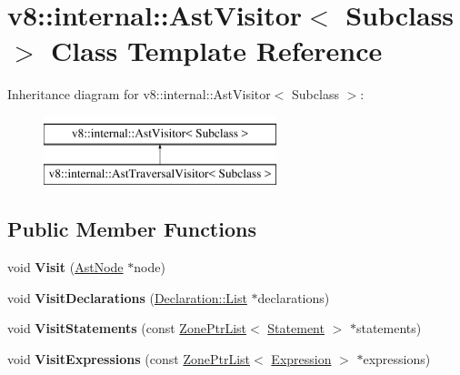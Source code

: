\hypertarget{classv8_1_1internal_1_1AstVisitor}{}\section{v8\+:\+:internal\+:\+:Ast\+Visitor$<$ Subclass $>$ Class Template Reference}
\label{classv8_1_1internal_1_1AstVisitor}
Inheritance diagram for v8\+:\+:internal\+:\+:Ast\+Visitor$<$ Subclass $>$\+:\begin{figure}[H]
\begin{center}
\leavevmode
\includegraphics[height=2.000000cm]{classv8_1_1internal_1_1AstVisitor}
\end{center}
\end{figure}
\subsection*{Public Member Functions}
\begin{DoxyCompactItemize}
\item 
\mbox{\label{classv8_1_1internal_1_1AstVisitor_a748e27887cfe2a26983f9e4ba61f586e}} 
void {\bfseries Visit} (\mbox{\hyperlink{classv8_1_1internal_1_1AstNode}{Ast\+Node}} $\ast$node)
\item 
\mbox{\label{classv8_1_1internal_1_1AstVisitor_a8b300e32da205ee9491c0d74dfb64876}} 
void {\bfseries Visit\+Declarations} (\mbox{\hyperlink{classv8_1_1base_1_1ThreadedListBase}{Declaration\+::\+List}} $\ast$declarations)
\item 
\mbox{\label{classv8_1_1internal_1_1AstVisitor_a4cf5a0dc8be29132c5b3a1f15549ed12}} 
void {\bfseries Visit\+Statements} (const \mbox{\hyperlink{classv8_1_1internal_1_1ZoneList}{Zone\+Ptr\+List}}$<$ \mbox{\hyperlink{classv8_1_1internal_1_1Statement}{Statement}} $>$ $\ast$statements)
\item 
\mbox{\label{classv8_1_1internal_1_1AstVisitor_ae1420e795838e6c4a84fae99a56abe24}} 
void {\bfseries Visit\+Expressions} (const \mbox{\hyperlink{classv8_1_1internal_1_1ZoneList}{Zone\+Ptr\+List}}$<$ \mbox{\hyperlink{classv8_1_1internal_1_1Expression}{Expression}} $>$ $\ast$expressions)
\end{DoxyCompactItemize}
